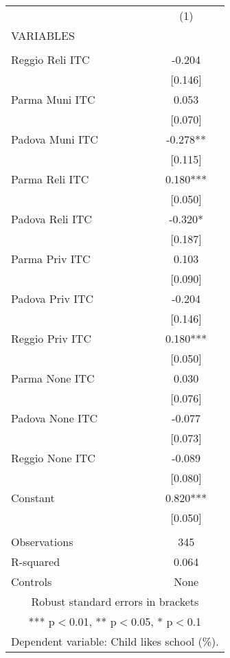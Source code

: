 \begin{tabular}{lc} \hline
 & (1) \\
VARIABLES &  \\ \hline
 &  \\
Reggio Reli ITC & -0.204 \\
 & [0.146] \\
Parma Muni ITC & 0.053 \\
 & [0.070] \\
Padova Muni ITC & -0.278** \\
 & [0.115] \\
Parma Reli ITC & 0.180*** \\
 & [0.050] \\
Padova Reli ITC & -0.320* \\
 & [0.187] \\
Parma Priv ITC & 0.103 \\
 & [0.090] \\
Padova Priv ITC & -0.204 \\
 & [0.146] \\
Reggio Priv ITC & 0.180*** \\
 & [0.050] \\
Parma None ITC & 0.030 \\
 & [0.076] \\
Padova None ITC & -0.077 \\
 & [0.073] \\
Reggio None ITC & -0.089 \\
 & [0.080] \\
Constant & 0.820*** \\
 & [0.050] \\
 &  \\
Observations & 345 \\
R-squared & 0.064 \\
 Controls & None \\ \hline
\multicolumn{2}{c}{ Robust standard errors in brackets} \\
\multicolumn{2}{c}{ *** p$<$0.01, ** p$<$0.05, * p$<$0.1} \\
\multicolumn{2}{c}{ Dependent variable: Child likes school (\%).} \\
\end{tabular}
